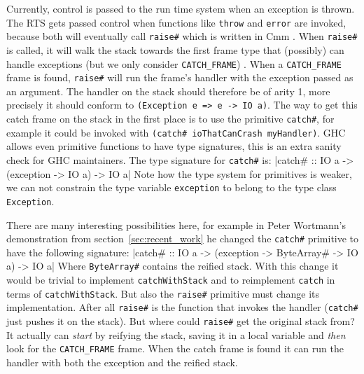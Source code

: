 Currently, control is passed to the run time system when an
exception is thrown. The RTS gets passed control when functions like
\texttt{throw} \cite{hackage_base_control_exception_throw} and \texttt{error}
are invoked, because both will eventually call \texttt{raise\#} which is
written in Cmm \cite{github_raisezh}. When \texttt{raise\#} is called, it
will walk the stack towards the first frame type that (possibly) can
handle exceptions (but we only consider \texttt{CATCH\_FRAME})
\cite{github_raisezh_calls_helper, github_raiseExceptionHelter}.
When a \texttt{CATCH\_FRAME} frame is found, \texttt{raise\#} will
run the frame's handler with the exception passed as an argument. The
handler on the stack should therefore be of arity 1, more precisely
it should conform to \texttt{(Exception e => e -> IO a)}. The way to get
this catch frame on the stack in the first place is to use the primitive
\texttt{catch\#}, for example it could be invoked with \texttt{(catch\#
  ioThatCanCrash myHandler)}. GHC allows even primitive functions to
have type signatures, this is an extra sanity check for GHC maintainers.
The type signature for \texttt{catch\#} is:
|catch# :: IO a -> (exception -> IO a) -> IO a|
Note how the type system for primitives is weaker, we can not constrain
the type variable \texttt{exception} to belong to the type class \texttt{Exception}.


There are many interesting possibilities here, for example in Peter
Wortmann's demonstration from section~\ref{sec:recent_work} he changed the
\texttt{catch\#} primitive to have the following signature:
|catch# :: IO a -> (exception -> ByteArray# -> IO a) -> IO a|
Where \texttt{ByteArray\#} contains the reified stack. With this change
it would be trivial to implement \texttt{catchWithStack} and
to reimplement \texttt{catch} in terms of \texttt{catchWithStack}. But
also the \texttt{raise\#} primitive must change its implementation. After
all \texttt{raise\#} is the function that invokes the handler
(\texttt{catch\#} just pushes it on the stack). But where could
\texttt{raise\#} get the original stack from? It actually can \emph{start} by
reifying the stack, saving it in a local variable and \emph{then} look
for the \texttt{CATCH\_FRAME} frame. When the catch frame is found it
can run the handler with both the exception and the reified stack.

